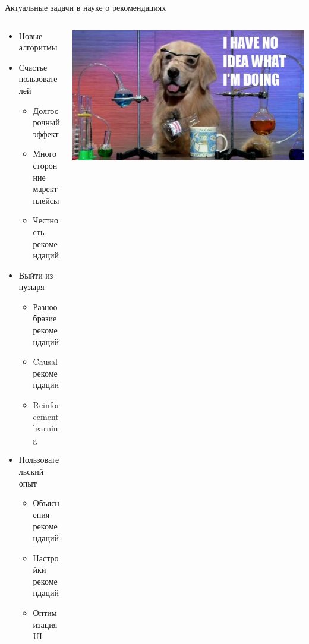 \documentclass[11pt,aspectratio=169,handout]{beamer}
\begin{document}
\begin{frame}{Актуальные задачи в науке о рекомендациях}

\begin{columns}

\begin{column}{0.5\textwidth}
\begin{itemize}[<+->]
\item Новые алгоритмы
\item Счастье пользователей
	\begin{itemize}
	\item Долгосрочный эффект
	\item Многосторонние маректплейсы
	\item Честность рекомендаций
	\end{itemize}
\item Выйти из пузыря
	\begin{itemize}
	\item Разнообразие рекомендаций
	\item Causal рекомендации
	\item Reinforcement learning
	\end{itemize}
\item Пользовательский опыт
	\begin{itemize}
	\item Объяснения рекомендаций
	\item Настройки рекомендаций
	\item Оптимизация UI
	\end{itemize}
\end{itemize}
\end{column}

\begin{column}{0.4\textwidth}
\begin{center}
\includegraphics[scale=0.2]{images/science.jpeg}
\end{center}
\end{column}

\end{columns}

\end{frame}
\end{document}
